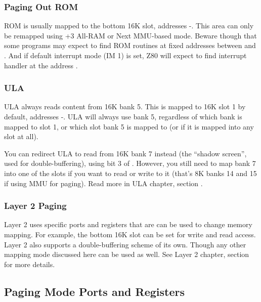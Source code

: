 \subsubsection{Paging Out ROM}

ROM is usually mapped to the bottom 16K slot, addresses -. This area can only be remapped using +3 All-RAM or Next MMU-based mode. Beware though that some programs may expect to find ROM routines at fixed addresses between  and . And if default interrupt mode (IM 1) is set, Z80 will expect to find interrupt handler at the address .


\subsubsection{ULA}

ULA always reads content from 16K bank 5. This is mapped to 16K slot 1 by default, addresses -. ULA will always use bank 5, regardless of which bank is mapped to slot 1, or which slot bank 5 is mapped to (or if it is mapped into any slot at all).

You can redirect ULA to read from 16K bank 7 instead (the ``shadow screen'', used for double-buffering), using bit 3 of . However, you still need to map bank 7 into one of the slots if you want to read or write to it (that's 8K banks 14 and 15 if using MMU for paging). Read more in ULA chapter, section .


\subsubsection{Layer 2 Paging}

Layer 2 uses specific ports and registers that are can be used to change memory mapping. For example, the bottom 16K slot can be set for write and read access. Layer 2 also supports a double-buffering scheme of its own. Though any other mapping mode discussed here can be used as well. See Layer 2 chapter, section  for more details.



\pagebreak

\subsection{Paging Mode Ports and Registers}
\label{zx_next_memorypaging_registers}

